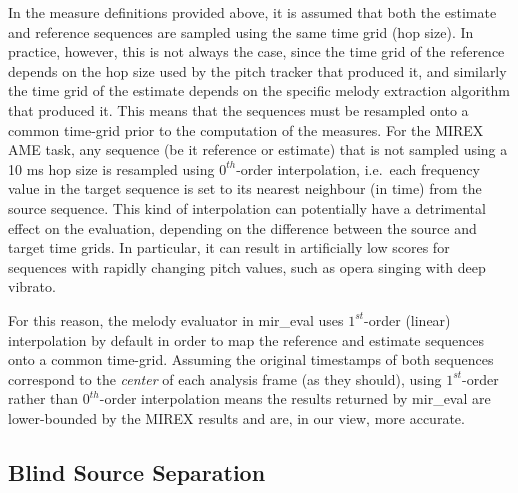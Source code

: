 \documentclass{article}
\begin{document}
In the measure definitions provided above, it is assumed that both the estimate
and reference sequences are sampled using the same time grid (hop size). In
practice, however, this is not always the case, since the time grid of the
reference depends on the hop size used by the pitch tracker that produced
it, and similarly the time grid of the estimate depends on the specific melody
extraction algorithm that produced it. This means that the sequences must be
resampled onto a common time-grid prior to the computation of the measures. For
the MIREX AME task, any sequence (be it reference or estimate) that is not
sampled using a 10 ms hop size is resampled using $0^{th}$-order interpolation,
i.e.~each frequency value in the target sequence is set to its nearest
neighbour (in time) from the source sequence. This kind of interpolation can
potentially have a detrimental effect on the evaluation, depending on the
difference between the source and target time grids. In particular, it can
result in artificially low scores for sequences with rapidly changing pitch
values, such as opera singing with deep vibrato. 

For this reason, the melody evaluator in mir\_eval uses $1^{st}$-order (linear)
interpolation by default in order to map the reference and estimate sequences
onto a common time-grid. Assuming the original timestamps of both sequences
correspond to the \textit{center} of each analysis frame (as they should),
using $1^{st}$-order rather than $0^{th}$-order interpolation means the results
returned by mir\_eval are lower-bounded by the MIREX results and are, in our
view, more accurate.

\subsection{Blind Source Separation}


% 
\end{document}
